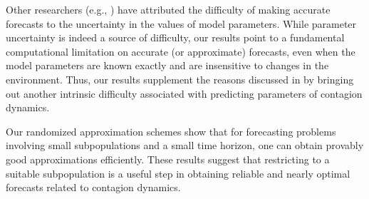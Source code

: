 \medskip
Other researchers 
(e.g., \cite{Drake-2005,Drake-2006, Martin_etal_2016,May-2006,beckage:ecosphere11})
have attributed the difficulty of making accurate 
forecasts to the uncertainty in the values of model parameters.
While parameter uncertainty is indeed a source of difficulty,
our results point to a fundamental computational limitation on
accurate (or approximate) forecasts, even when the 
model parameters are known exactly and are 
insensitive to changes in the environment.
Thus, our results supplement the reasons discussed in 
\cite{Drake-2005,Drake-2006, Martin_etal_2016,May-2006,beckage:ecosphere11}
by bringing out another intrinsic difficulty associated with
predicting parameters of contagion dynamics.

\medskip
Our randomized approximation schemes show that for forecasting
problems involving small subpopulations and a small time horizon,
one can obtain provably good approximations efficiently. 
These results suggest that restricting to a suitable 
subpopulation is a useful step in obtaining reliable and nearly optimal
forecasts related to contagion dynamics.
\fi

\iffalse
\bigskip

\noindent
{\Large\textbf{Remarks About the Techniques Used}}

\medskip
\noindent
The \cnump-hardness results and the difficulty of approximating
the solution value shown in Table~\ref{init:tab:gen_results}
are obtained through reductions from the problem of counting
the number of satisfying assignments to the Monotone 2SAT problem
studied in \cite{Vad-2001,Zu-1996}.
We prove the efficient solvability of the problems for $t = 1$ by 
developing a dynamic programming algorithm for a more
general problem that encompasses \tNewInfs,
\tTotInfs, \tVuls{} and \tTotVuls.
The randomized approximation scheme for \tTotVuls{}
(when $t$ and $|S|$ are fixed) is based on a reduction to the
problem of counting the number of satisfying assignments to
a Boolean formula in disjunctive normal form (DNF). 
In establishing some of the results for 
realistic (e.g., small world) networks 
(see Table~\ref{init:tab:realistic_results}),
we use FKG inequalities from probability theory \cite{FKG_1971}.
The results presented in Tables~\ref{init:tab:new_measures_results}
and \ref{init:tab:results_for_models} use appropriate modifications
of the constructions used to prove the results mentioned in 
Table~\ref{init:tab:gen_results}.
\fi

